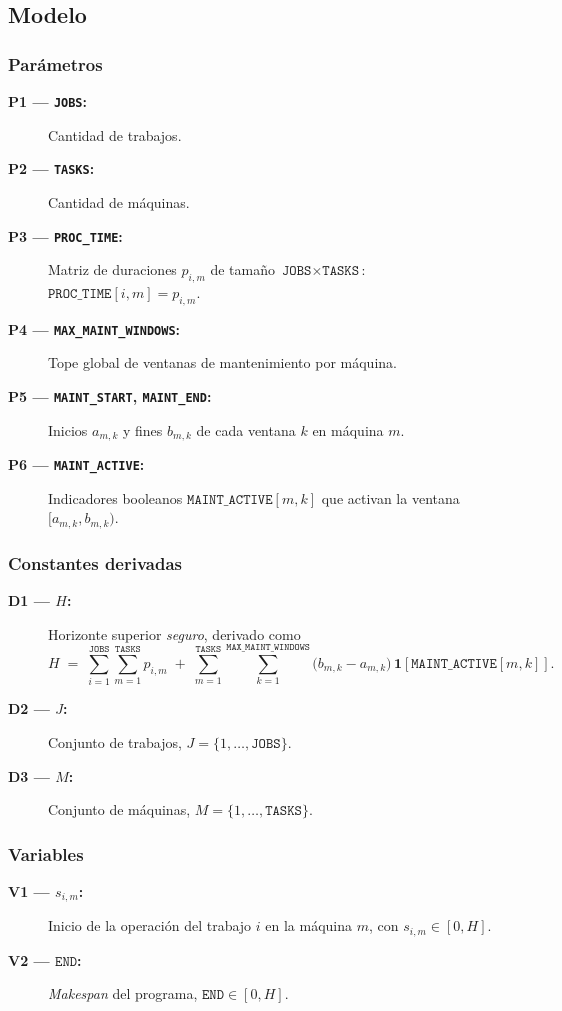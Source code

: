 
\subsection{Modelo}\label{sec:01-jobshop_mantenimiento-modelo}

\subsubsection*{Parámetros}
\begin{description}
  \item[\textbf{P1 — \texttt{JOBS}:}] Cantidad de trabajos.
  \item[\textbf{P2 — \texttt{TASKS}:}] Cantidad de máquinas.
  \item[\textbf{P3 — \texttt{PROC\_TIME}:}] Matriz de duraciones \(p_{i,m}\) de tamaño \(\texttt{JOBS}\times\texttt{TASKS}\): \(\texttt{PROC\_TIME}[i,m]=p_{i,m}\).
  \item[\textbf{P4 — \texttt{MAX\_MAINT\_WINDOWS}:}] Tope global de ventanas de mantenimiento por máquina.
  \item[\textbf{P5 — \texttt{MAINT\_START}, \texttt{MAINT\_END}:}] Inicios \(a_{m,k}\) y fines \(b_{m,k}\) de cada ventana \(k\) en máquina \(m\).
  \item[\textbf{P6 — \texttt{MAINT\_ACTIVE}:}] Indicadores booleanos \(\texttt{MAINT\_ACTIVE}[m,k]\) que activan la ventana \([a_{m,k}, b_{m,k})\).
\end{description}

\subsubsection*{Constantes derivadas}
\begin{description}
  \item[\textbf{D1 — \(H\):}] Horizonte superior \emph{seguro}, derivado como
  \[
  H \;=\; \sum_{i=1}^{\texttt{JOBS}}\sum_{m=1}^{\texttt{TASKS}} p_{i,m}
  \;+\; \sum_{m=1}^{\texttt{TASKS}}\sum_{k=1}^{\texttt{MAX\_MAINT\_WINDOWS}}
  \bigl(b_{m,k}-a_{m,k}\bigr)\,\mathbf{1}\!\left[\texttt{MAINT\_ACTIVE}[m,k]\right].
  \]
  \item[\textbf{D2 — \(J\):}] Conjunto de trabajos, \(J=\{1,\dots,\texttt{JOBS}\}\).
  \item[\textbf{D3 — \(M\):}] Conjunto de máquinas, \(M=\{1,\dots,\texttt{TASKS}\}\).
\end{description}

\subsubsection*{Variables}
\begin{description}
  \item[\textbf{V1 — \(s_{i,m}\):}] Inicio de la operación del trabajo \(i\) en la máquina \(m\), con \(s_{i,m}\in[0,H]\).
  \item[\textbf{V2 — \(\texttt{END}\):}] \emph{Makespan} del programa, \(\texttt{END}\in[0,H]\).
\end{description}

